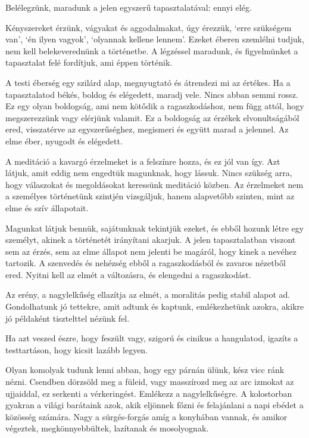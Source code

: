 
Belélegzünk, maradunk a jelen egyszerű tapasztalatával: ennyi elég.

Kényszereket érzünk, vágyakat és aggodalmakat, úgy érezzük, `erre
szükségem van', `én ilyen vagyok', `olyannak kellene lennem'. Ezeket
éberen szemlélni tudjuk, nem kell belekeverednünk a történetbe. A
légzéssel maradunk, és figyelmünket a tapasztalat felé fordítjuk, ami
éppen történik.

A testi éberség egy szilárd alap, megnyugtató és átrendezi mi az
értékes. Ha a tapasztalatod békés, boldog és elégedett, maradj vele.
Nincs abban semmi rossz. Ez egy olyan boldogság, ami nem kötődik a
ragaszkodáshoz, nem függ attól, hogy megszerezzünk vagy elérjünk
valamit. Ez a boldogság az érzékek elvonultságából ered, visszatérve az
egyszerűséghez, megismeri és együtt marad a jelennel. Az elme éber,
nyugodt és elégedett.

A meditáció a kavargó érzelmeket is a felszínre hozza, és ez jól van
így. Azt látjuk, amit eddig nem engedtük magunknak, hogy lássuk. Nincs
szükség arra, hogy válaszokat és megoldásokat keressünk meditáció
közben. Az érzelmeket nem a személyes történetünk szintjén vizsgáljuk,
hanem alapvetőbb szinten, mint az elme és szív állapotait.

Magunkat látjuk bennük, sajátunknak tekintjük ezeket, és ebből hozunk
létre egy személyt, akinek a történetét irányítani akarjuk. A jelen
tapasztalatban viszont sem az érzés, sem az elme állapot nem jelenti be
magáról, hogy kinek a nevéhez tartozik. A szenvedés és nehézség ebből a
ragaszkodásból és zavaros nézetből ered. Nyitni kell az elmét a
változásra, és elengedni a ragaszkodást.


Az erény, a nagylelkűség ellazítja az elmét, a moralitás pedig stabil
alapot ad. Gondolhatunk jó tettekre, amit adtunk és kaptunk,
emlékezhetünk azokra, akikre jó példaként tisztelttel nézünk fel.

Ha azt veszed észre, hogy feszült vagy, szigorú és cinikus a hangulatod,
igazíts a testtartáson, hogy kicsit lazább legyen.

Olyan komolyak tudunk lenni abban, hogy egy párnán ülünk, kész vicc ránk
nézni. Csendben dörzsöld meg a füleid, vagy masszírozd meg az arc
izmokat az ujjaiddal, ez serkenti a vérkeringést. Emlékezz a
nagylelkűségre. A kolostorban gyakran a világi barátaink azok, akik
eljönnek főzni és felajánlani a napi ebédet a közösség számára. Nagy a
sürgés-forgás amíg a konyhában vannak, és amikor végeztek,
megkönnyebbültek, lazítanak és mosolyognak.

